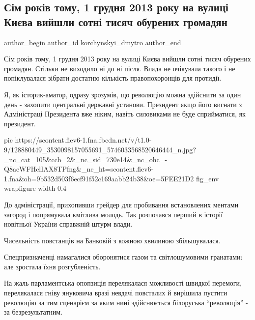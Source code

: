  
 
 
 
 
 
\subsection{Сім років тому, 1 грудня 2013 року на вулиці Києва вийшли сотні тисяч обурених громадян}
\label{sec:01_12_2020.fb.korchynskyi_dmytro.1.kiev_majdan_2013}
\ifcmt
	author_begin
   author_id korchynskyi_dmytro
	author_end
\fi

Сім років тому, 1 грудня 2013 року на вулиці Києва вийшли сотні тисяч обурених
громадян. Стільки не виходило ні до ні після.  Влада не очікувала такого і не
попіклувалася зібрати достатню кількість правопохоронців для протидії.

Я, як історик-аматор, одразу зрозумів, що революцію можна здійснити за один
день - захопити центральні державні установи. Президент якщо його вигнати з
Адміністраці Президента вже ніким, навіть силовиками не буде сприйматися, як
президент.

\ifcmt
pic https://scontent.fiev6-1.fna.fbcdn.net/v/t1.0-9/128880449_3530098157055691_5746033568520646444_n.jpg?_nc_cat=105&ccb=2&_nc_sid=730e14&_nc_ohc=-Q8aeWFHclIAX8TPfng&_nc_ht=scontent.fiev6-1.fna&oh=9b532d503f6ecf91f52c169aabb24b38&oe=5FEE21D2
fig_env wrapfigure
width 0.4
\fi

До адміністрації, прихопивши грейдер для пробивання встановлених ментами
загород і попрямувала кмітлива молодь.  Так розпочався перший в історії
новітньої України справжній штурм влади.

Чисельність повстанців на Банковій з кожною хвилиною збільшувалася.

Спецпризначенці намагалися оборонятися газом та світлошумовими гранатами: але
зростала їхня розгубленість.

На жаль парламентська опопзиція перелякалася можливості швидкої перемоги,
перелякалася гніву януковича вразі невдачі повсталих й вирішила пустити
революцію за тим сценарієм за яким нині здійснюється білоруська \enquote{революція} -
за безрезультатним.

